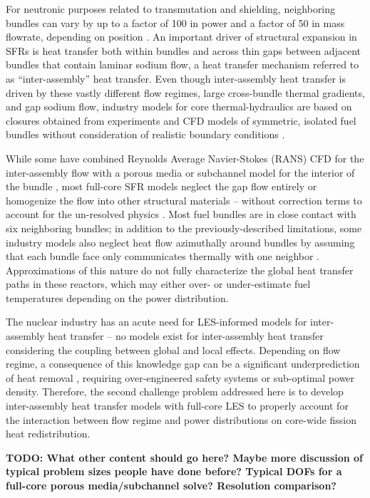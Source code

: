 \documentclass[11pt,letterpaper,english]{article}
\begin{document}
For neutronic purposes related to transmutation and shielding, neighboring bundles can vary by up to a factor of 100 in power and a factor of 50 in mass flowrate, depending on position \cite{abr}. An important driver of structural expansion in SFRs is heat transfer both within bundles and across thin gaps between adjacent bundles that contain laminar sodium flow, a heat transfer mechanism referred to as ``inter-assembly'' heat transfer. Even though inter-assembly heat transfer is driven by these vastly different flow regimes, large cross-bundle thermal gradients, and gap sodium flow, industry models for core thermal-hydraulics are based on closures obtained from experiments and CFD models of symmetric, isolated fuel bundles without consideration of realistic boundary conditions \cite{touran}. 

While some have combined Reynolds Average Navier-Stokes (RANS) CFD for the inter-assembly flow with a porous media or subchannel model for the interior of the bundle \cite{wang2020,gerschenfeld}, most full-core SFR models neglect the gap flow entirely \cite{touran} or homogenize the flow into other structural materials \cite{fiorina_of} -- without correction terms to account for the un-resolved physics \cite{touran,fiorina_of}. Most fuel bundles are in close contact with six neighboring bundles; in addition to the previously-described limitations, some industry models also neglect heat flow azimuthally around bundles by assuming that each bundle face only communicates thermally with one neighbor \cite{touran}. Approximations of this nature do not fully characterize the global heat transfer paths in these reactors, which may either over- or under-estimate fuel temperatures depending on the power distribution.

The nuclear industry has an acute need for LES-informed models for inter-assembly heat transfer -- no models exist for inter-assembly heat transfer considering the coupling between global and local effects. Depending on flow regime, a consequence of this knowledge gap can be a significant underprediction of heat removal \cite{gerschenfeld}, requiring over-engineered safety systems or sub-optimal power density. Therefore, the second challenge problem addressed here is to develop inter-assembly heat transfer models with full-core LES to properly account for the interaction between flow regime and power distributions on core-wide fission heat redistribution. 


{\bf TODO: What other content should go here? Maybe more discussion of typical problem sizes people have done before? Typical DOFs for a full-core porous media/subchannel solve? Resolution comparison?}
\end{document}
